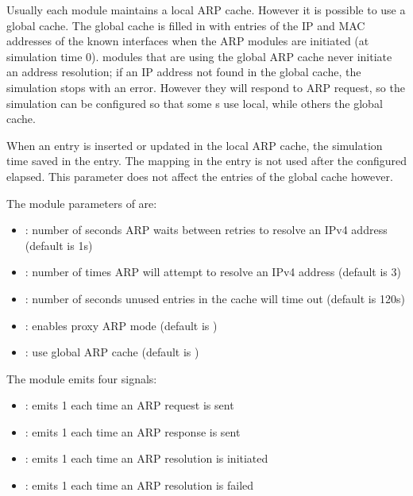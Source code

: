 Usually each  module maintains a local ARP cache.
However it is possible to use a global cache. The global cache is filled
in with entries of the IP and MAC addresses of the known interfaces
when the ARP modules are initiated (at simulation time 0).
 modules that are using the global ARP cache
never initiate an address resolution; if an IP address not
found in the global cache, the simulation stops with an error.
However they will respond to ARP request, so the simulation can
be configured so that some s use local, while others
the global cache.

When an entry is inserted or updated in the local ARP cache,
the simulation time saved in the entry. The mapping in the
entry is not used after the configured 
elapsed. This parameter does not affect the entries of
the global cache however.


The module parameters of  are:

\begin{itemize}
  \item {}: number of seconds ARP waits between retries to resolve an IPv4 address (default is 1s)
  \item {}: number of times ARP will attempt to resolve an IPv4 address (default is 3)
  \item {}: number of seconds unused entries in the cache will time out (default is 120s)
  \item {}: enables proxy ARP mode (default is )
  \item {}: use global ARP cache (default is )
\end{itemize}

The  module emits four signals:

\begin{itemize}
  \item {}: emits 1 each time an ARP request is sent
  \item {}: emits 1 each time an ARP response is sent
  \item {}: emits 1 each time an ARP resolution is initiated 
  \item {}: emits 1 each time an ARP resolution is failed
\end{itemize}

